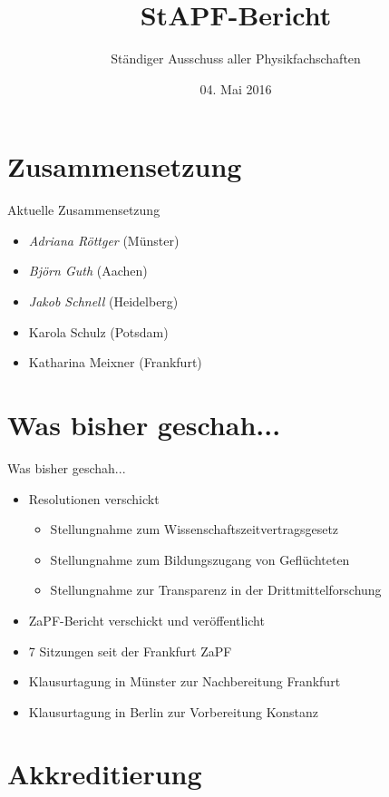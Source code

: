 \documentclass[compress, aspectratio=169]{beamer}
\title[StAPf-Bericht]{StAPF-Bericht}
\author{Ständiger Ausschuss aller Physikfachschaften}
\institute[Zusammenkunft aller Physikfachschaften]
\date{04. Mai 2016}
\begin{document}
\begin{frame}[plain]{}
  \titlepage
\end{frame}

\section{Zusammensetzung}

\begin{frame}{Aktuelle Zusammensetzung}
	\begin{itemize}
		\item \emph{Adriana Röttger} (Münster)
		\item \emph{Björn Guth} (Aachen)
		\item \emph{Jakob Schnell} (Heidelberg)
		\item Karola Schulz (Potsdam)
		\item Katharina Meixner (Frankfurt)
	\end{itemize}
\end{frame}

\section{Was bisher geschah...}

\begin{frame}{Was bisher geschah...}
	\begin{itemize}
		\item Resolutionen verschickt
			\begin{itemize}
				\item Stellungnahme zum Wissenschaftszeitvertragsgesetz
				\item Stellungnahme zum Bildungszugang von Geflüchteten
				\item Stellungnahme zur Transparenz in der Drittmittelforschung
			\end{itemize}
		\item ZaPF-Bericht verschickt und veröffentlicht
		\item 7 Sitzungen seit der Frankfurt ZaPF
		\item Klausurtagung in Münster zur Nachbereitung Frankfurt
		\item Klausurtagung in Berlin zur Vorbereitung Konstanz
	\end{itemize}
\end{frame}

\section{Akkreditierung}
\end{document}
